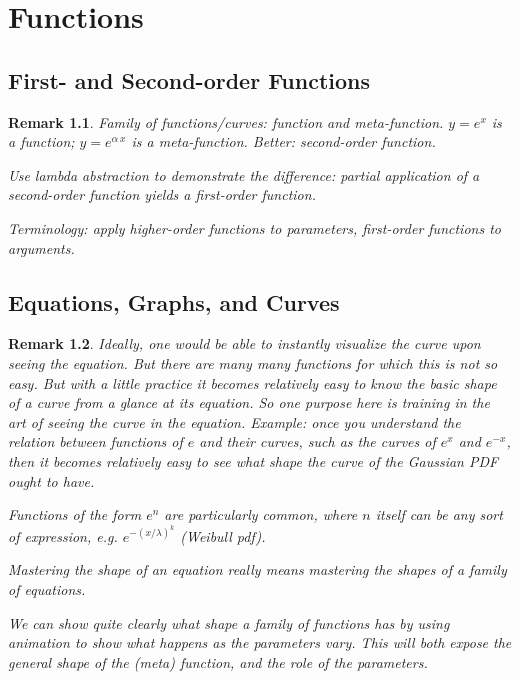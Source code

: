 \documentclass[reqno,12pt]{tufte-book}
\numberwithin{equation}{subsection}
\newtheorem{remark}{Remark}
\begin{document}
\chapter{Functions}

\section{First- and Second-order Functions}

\begin{remark}
Family of functions/curves: function and meta-function.  $y=e^x$ is a
function; $y=e^{\alpha\ x}$ is a meta-function.  Better: second-order function.

Use lambda abstraction to demonstrate the difference: partial
application of a second-order function yields a first-order function.

Terminology: apply higher-order functions to \textit{parameters},
first-order functions to \textit{arguments}.
\end{remark}

\section{Equations, Graphs, and Curves}

\begin{remark}
  Ideally, one would be able to instantly visualize the curve upon
  seeing the equation.  But there are many many functions for which
  this is not so easy.  But with a little practice it becomes
  relatively easy to know the basic shape of a curve from a glance at
  its equation.  So one purpose here is training in the art of seeing
  the curve in the equation.  Example: once you understand the
  relation between functions of $e$ and their curves, such as the
  curves of $e^x$ and $e^{-x}$, then it becomes relatively easy to see
  what shape the curve of the Gaussian PDF ought to have.

  Functions of the form $e^n$ are particularly common, where $n$
  itself can be any sort of expression, e.g. $e^{-(x/\lambda)^k}$
  (Weibull pdf).

  Mastering the shape of an equation really means mastering the shapes
  of a family of equations.

  We can show quite clearly what shape a family of functions has by
  using animation to show what happens as the parameters vary.  This
  will both expose the general shape of the (meta) function, and the
  role of the parameters.
\end{remark}
\end{document}
